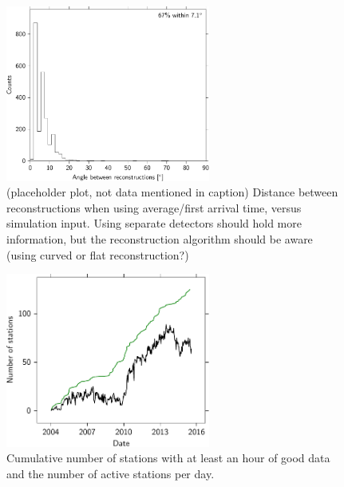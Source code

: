 \begin{figure}
    \centering
    \includegraphics[width=0.6\textwidth]
                    {plots/experiment/angle_between_501_minn16_510}
    \caption{(placeholder plot, not data mentioned in caption) Distance between reconstructions when using average/first arrival time, versus simulation input. Using separate detectors should hold more information, but the reconstruction algorithm should be aware (using curved or flat reconstruction?)}
    \label{fig:angle_between_501_minn16_510}
\end{figure}


\begin{figure}
    \centering
    \includegraphics[width=0.6\textwidth]
                    {plots/experiment/active_stations}
    \caption{Cumulative number of stations with at least an hour of good data and the number of active stations per day.}
    \label{fig:active_stations}
\end{figure}

